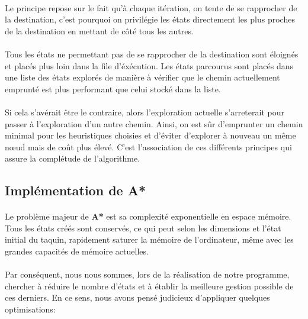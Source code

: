 \documentclass[10pt,a4paper]{report}
\begin{document}
\paragraph{}{Le principe repose sur le fait qu'à chaque itération, on tente de se rapprocher de la destination, c’est pourquoi on privilégie les états directement les plus proches de la destination en mettant de côté tous les autres.}
\paragraph{}{Tous les états ne permettant pas de se rapprocher de la destination sont éloignés et placés plus loin dans la file d'éxécution. Les états parcourus sont placés dans une liste des états explorés de manière à vérifier que le chemin actuellement emprunté est plus performant que celui stocké dans la liste.}
\paragraph{}{Si cela s'avérait être le contraire, alors l'exploration actuelle s'arreterait pour passer à l'exploration d'un autre chemin. Ainsi, on est sûr d'emprunter un chemin minimal pour les heuristiques choisies et d'éviter d'explorer à nouveau un même nœud mais de coût plus élevé. C'est l'association de ces différents principes qui assure la complétude de l'algorithme.}
\subsection{Implémentation de \textbf{A*}}
\paragraph{}{Le problème majeur de \textbf{A*} est sa complexité exponentielle en espace mémoire. Tous les états créés sont conservés, ce qui peut selon les dimensions et l'état initial du taquin, rapidement saturer la mémoire de l'ordinateur, même avec les grandes capacités de mémoire actuelles.}
\paragraph{}{Par conséquent, nous nous sommes, lors de la réalisation de notre programme, chercher à réduire le nombre d’états et à établir la meilleure gestion possible de ces derniers. En ce sens, nous avons pensé judicieux d'appliquer quelques optimisations:}
\end{document}
